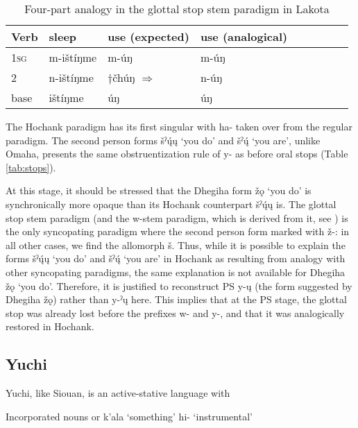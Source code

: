 \documentclass[oneside,a4paper,11pt]{article}
\newcommand{\ipa}[1]{{\phon#1}} %
\begin{document}
\begin{table}[H]
\caption{Four-part analogy in the glottal stop stem paradigm in Lakota} \label{tab:analogy.glottal} \centering
\begin{tabular}{lllllllll}
\toprule
Verb & sleep & use (expected) & use (analogical) \\
\midrule
\textsc{1sg} &\ipa{m-ištíŋme} &\ipa{m-úŋ} &\ipa{m-úŋ} &\\
2 & 	\ipa{n-ištíŋme}&$\dagger$\ipa{čhúŋ} $\Rightarrow$ &\ipa{n-úŋ} &  \\ 
base & \ipa{ištíŋme}	 &\ipa{úŋ} &\ipa{úŋ} & 	\\
\bottomrule
\end{tabular}
\end{table}

The Hochank paradigm has its first singular with \ipa{ha-} taken over from the regular paradigm. The second person forms \ipa{šˀų́ų} `you do' and \ipa{šˀų́} `you are', unlike Omaha, presents the same obstruentization rule of \ipa{*y-} as before oral stops (Table \ref{tab:stops}).

At this stage, it should be stressed that the Dhegiha form \ipa{žǫ} `you do' is synchronically more opaque than its Hochank counterpart \ipa{šˀų́ų} is. The glottal stop stem paradigm (and the w-stem paradigm, which is derived from it, see \citealt[496]{rankin05quapaw}) is the only syncopating paradigm where the second person form marked with \ipa{ž-}: in all other cases, we find the allomorph \ipa{š}. Thus, while it is possible to explain the forms \ipa{šˀų́ų} `you do' and \ipa{šˀų́} `you are' in Hochank as resulting from analogy with other syncopating paradigms, the same explanation is not available for Dhegiha \ipa{žǫ} `you do'. Therefore, it is justified to reconstruct PS \ipa{*y-ų} (the form suggested by Dhegiha \ipa{žǫ}) rather than \ipa{*y-ˀų} here. This implies that at the PS stage, the glottal stop was already lost before the prefixes \ipa{*w-} and \ipa{*y-}, and that it was analogically restored in Hochank.

\subsection{Yuchi}
Yuchi, like Siouan, is an active-stative language with 


\citet[334]{wagner38yuchi}

Incorporated nouns or \ipa{k'ala} `something' \ipa{hi-} `instrumental'
\end{document}
